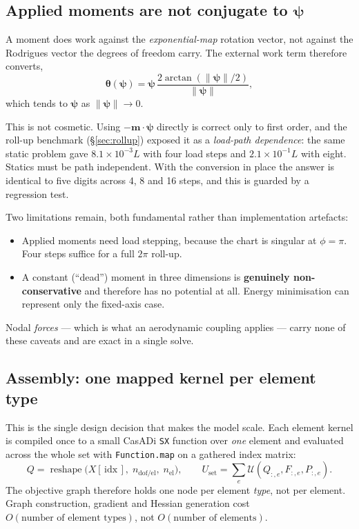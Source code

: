 \documentclass[11pt,a4paper]{article}
\newcommand{\code}[1]{\texttt{\small #1}}
\begin{document}
\subsection{Applied moments are not conjugate to \texorpdfstring{$\boldsymbol{\psi}$}{psi}}
\label{sec:moments}

A moment does work against the \emph{exponential-map} rotation vector, not
against the Rodrigues vector the degrees of freedom carry. The external work
term therefore converts,
\begin{equation}
  \boldsymbol{\theta}(\boldsymbol{\psi}) = \boldsymbol{\psi}\,
  \frac{2\arctan\!\left(\lVert\boldsymbol{\psi}\rVert/2\right)}{\lVert\boldsymbol{\psi}\rVert},
\end{equation}
which tends to $\boldsymbol{\psi}$ as $\lVert\boldsymbol{\psi}\rVert \to 0$.

This is not cosmetic. Using $-\mathbf{m}\cdot\boldsymbol{\psi}$ directly is
correct only to first order, and the roll-up benchmark
(\S\ref{sec:rollup}) exposed it as a \emph{load-path dependence}: the same
static problem gave $8.1\times10^{-3}L$ with four load steps and
$2.1\times10^{-1}L$ with eight. Statics must be path independent. With the
conversion in place the answer is identical to five digits across 4, 8 and 16
steps, and this is guarded by a regression test.

Two limitations remain, both fundamental rather than implementation artefacts:

\begin{itemize}
\item Applied moments need load stepping, because the chart is singular at
$\phi = \pi$. Four steps suffice for a full $2\pi$ roll-up.
\item A constant (``dead'') moment in three dimensions is \textbf{genuinely
non-conservative} and therefore has no potential at all. Energy minimisation can
represent only the fixed-axis case.
\end{itemize}

Nodal \emph{forces} --- which is what an aerodynamic coupling applies --- carry
none of these caveats and are exact in a single solve.

\subsection{Assembly: one mapped kernel per element type}
\label{sec:assembly}

This is the single design decision that makes the model scale. Each element
kernel is compiled once to a small CasADi \code{SX} function over \emph{one}
element and evaluated across the whole set with \code{Function.map} on a
gathered index matrix:
\[
  Q = \operatorname{reshape}\big(X[\,\mathrm{idx}\,],\; n_{\text{dof/el}},\; n_{\text{el}}\big),
  \qquad
  U_{\text{set}} = \textstyle\sum_e \mathcal{U}(Q_{:,e}, F_{:,e}, P_{:,e}).
\]
The objective graph therefore holds one node per element \emph{type}, not per
element. Graph construction, gradient and Hessian generation cost
$O(\text{number of element types})$, not $O(\text{number of elements})$.
\end{document}
